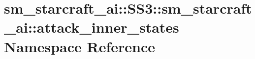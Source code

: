 \hypertarget{namespacesm__starcraft__ai_1_1SS3_1_1sm__starcraft__ai_1_1attack__inner__states}{}\section{sm\+\_\+starcraft\+\_\+ai\+:\+:S\+S3\+:\+:sm\+\_\+starcraft\+\_\+ai\+:\+:attack\+\_\+inner\+\_\+states Namespace Reference}
\label{namespacesm__starcraft__ai_1_1SS3_1_1sm__starcraft__ai_1_1attack__inner__states}
